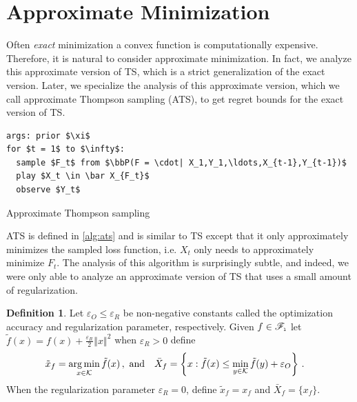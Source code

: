 \documentclass[letter, 12pt]{report}
\newcommand{\epsR}{{\epsilon_R}}
\newcommand{\epsO}{{\epsilon_O}}
\newcommand{\pl}{\text{\tiny\texttt{l}}}
\newcommand{\argmin}{\operatornamewithlimits{arg\,min}}
\newcommand{\norm}[1]{\left \Vert  #1 \right \Vert}
\newcommand{\cK}{\mathcal K}
\newcommand{\sF}{\mathscr F}
\newcommand{\bbP}{\mathbb P}
\newcommand{\1}{\mathbf{1}}
\newcommand{\ts}{\textsc{TS}\xspace}
\newcommand{\ats}{\textsc{ATS}}
\renewcommand{\epsilon}{\varepsilon}
\theoremstyle{plain}
\theoremstyle{definition}
\newtheorem{definition}[theorem]{Definition}
\theoremstyle{remark}
\begin{document}
\section{Approximate Minimization}
Often \textit{exact} minimization a convex function is computationally expensive.
Therefore, it is natural to consider approximate minimization.
In fact, we analyze this approximate version of \ts,
which is a strict generalization of the exact version.
Later, we specialize the analysis of this approximate version,
which we call approximate Thompson sampling (\ats{}),
to get regret bounds for the exact version of \ts.
\begin{algorithm}[h!]
    \begin{minipage}{12cm}
        \begin{mdframed}
            \begin{lstlisting}
args: prior $\xi$
for $t = 1$ to $\infty$:
  sample $F_t$ from $\bbP(F = \cdot| X_1,Y_1,\ldots,X_{t-1},Y_{t-1})$
  play $X_t \in \bar X_{F_t}$
  observe $Y_t$
\end{lstlisting}
            \caption{Approximate Thompson sampling}\label{alg:ats}
        \end{mdframed}
    \end{minipage}
\end{algorithm}
\ats{} is defined in \cref{alg:ats} and is similar to \ts except that it only approximately minimizes the sampled loss function,
i.e. $X_t$ only needs to approximately minimize $F_t$.
The analysis of this algorithm is surprisingly subtle,
and indeed, we were only able to analyze an approximate version of \ts that uses a small amount of regularization.

\begin{definition}\label{def:opt}
    Let $\epsO \leq \epsR$ be non-negative constants called the optimization accuracy and regularization parameter, respectively.
    Given $f \in \sF_{\pl}$ let $\tilde f(x) = f(x) + \frac{\epsR}{2} \norm{x}^2$ when $\epsR > 0$ define
    \begin{align*}
        \tilde x_f & = \argmin_{x \in \cK} \tilde f(x)\,,\,\,\text{and}                             &
        \bar X_f   & = \left\{x : \tilde f(x) \leq \min_{y \in \cK} \tilde f(y) + \epsO\right\} \,.
    \end{align*}
    When the regularization parameter $\epsR = 0$, define
    $\tilde x_f = x_f$
    and $\bar X_f = \{x_f\}$.
\end{definition}
\end{document}
